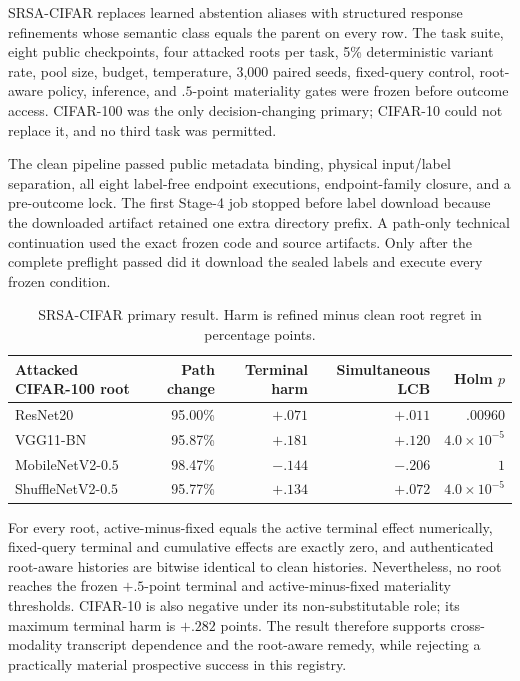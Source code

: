 SRSA-CIFAR replaces learned abstention aliases with structured response refinements whose semantic class equals the parent on every row. The task suite, eight public checkpoints, four attacked roots per task, 5\% deterministic variant rate, pool size, budget, temperature, 3,000 paired seeds, fixed-query control, root-aware policy, inference, and $.5$-point materiality gates were frozen before outcome access. CIFAR-100 was the only decision-changing primary; CIFAR-10 could not replace it, and no third task was permitted.

The clean pipeline passed public metadata binding, physical input/label separation, all eight label-free endpoint executions, endpoint-family closure, and a pre-outcome lock. The first Stage-4 job stopped before label download because the downloaded artifact retained one extra directory prefix. A path-only technical continuation used the exact frozen code and source artifacts. Only after the complete preflight passed did it download the sealed labels and execute every frozen condition.

\begin{table}[H]
\centering
\caption{SRSA-CIFAR primary result. Harm is refined minus clean root regret in percentage points.}
\label{tab:v21-srsa-cifar}
\small
\begin{tabular}{@{}lrrrr@{}}
\toprule
Attacked CIFAR-100 root & Path change & Terminal harm & Simultaneous LCB & Holm $p$ \\
\midrule
ResNet20 & 95.00\% & $+.071$ & $+.011$ & $.00960$ \\
VGG11-BN & 95.87\% & $+.181$ & $+.120$ & $4.0\times10^{-5}$ \\
MobileNetV2-$0.5$ & 98.47\% & $-.144$ & $-.206$ & $1$ \\
ShuffleNetV2-$0.5$ & 95.77\% & $+.134$ & $+.072$ & $4.0\times10^{-5}$ \\
\bottomrule
\end{tabular}
\end{table}

For every root, active-minus-fixed equals the active terminal effect numerically, fixed-query terminal and cumulative effects are exactly zero, and authenticated root-aware histories are bitwise identical to clean histories. Nevertheless, no root reaches the frozen $+.5$-point terminal and active-minus-fixed materiality thresholds. CIFAR-10 is also negative under its non-substitutable role; its maximum terminal harm is $+.282$ points. The result therefore supports cross-modality transcript dependence and the root-aware remedy, while rejecting a practically material prospective success in this registry.

